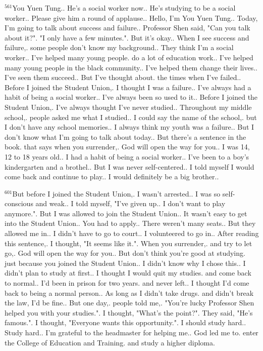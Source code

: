 \documentclass{book}
\begin{document}
$^{561}$You Yuen Tung..
He's a social worker now..
He's studying to be a social worker..
Please give him a round of applause..
Hello, I'm You Yuen Tung..
Today, I'm going to talk about success and failure..
Professor Shen said, "Can you talk about it?".
"I only have a few minutes.".
But it's okay..
When I see success and failure,.
some people don't know my background..
They think I'm a social worker..
I've helped many young people.
do a lot of education work..
I've helped many young people in the black community..
I've helped them change their lives..
I've seen them succeed..
But I've thought about.
the times when I've failed..
Before I joined the Student Union,.
I thought I was a failure..
I've always had a habit of being a social worker..
I've always been so used to it..
Before I joined the Student Union,.
I've always thought I've never studied..
Throughout my middle school,.
people asked me what I studied..
I could say the name of the school,.
but I don't have any school memories..
I always think my youth was a failure..
But I don't know what I'm going to talk about today..
But there's a sentence in the book.
that says when you surrender,.
God will open the way for you..
I was 14, 12 to 18 years old..
I had a habit of being a social worker..
I've been to a boy's kindergarten and a brothel..
But I was never self-centered..
I told myself I would come back and continue to play..
I would definitely be a big brother..

$^{601}$But before I joined the Student Union,.
I wasn't arrested..
I was so self-conscious and weak..
I told myself, "I've given up..
I don't want to play anymore.".
But I was allowed to join the Student Union..
It wasn't easy to get into the Student Union..
You had to apply..
There weren't many seats..
But they allowed me in..
I didn't have to go to court..
I volunteered to go in..
After reading this sentence,.
I thought, "It seems like it.".
When you surrender,.
and try to let go,.
God will open the way for you..
But don't think you're good at studying.
just because you joined the Student Union..
I didn't know why I chose this..
I didn't plan to study at first..
I thought I would quit my studies.
and come back to normal..
I'd been in prison for two years.
and never left..
I thought I'd come back to being a normal person..
As long as I didn't take drugs.
and didn't break the law, I'd be fine..
But one day,.
people told me,.
"You're lucky Professor Shen helped you with your studies.".
I thought, "What's the point?".
They said, "He's famous.".
I thought, "Everyone wants this opportunity.".
I should study hard..
Study hard..
I'm grateful to the headmaster for helping me..
God led me to.
enter the College of Education and Training.
and study a higher diploma.
\end{document}
